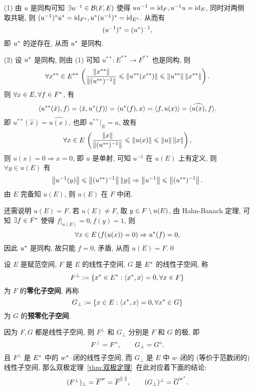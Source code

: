     \begin{Proof}
        (1) 由 $ u $ 是同构可知 $ \exists u^{-1}\in\mathcal{B}(F, E) $ 使得 $ uu^{-1}=\mathrm{id}_{F}, u^{-1}u=\mathrm{id}_{E} $, 同时对两侧取共轭, 则 $ (u^{-1})^{*}u^{*}=\mathrm{id}_{F^{*}},u^{*}(u^{-1})^{*}=\mathrm{id}_{E^{*}}  $. 从而有
        \[
            (u^{-1})^{*}=(u^{*})^{-1},
        \]
        即 $ u^{*} $ 的逆存在, 从而 $ u^{*} $ 是同构.

        (2) 设 $ u^{*} $ 是同构, 则由 (1) 可知 $ u^{**}: E^{**}\to F^{**} $ 也是同构, 则
        \[
            \forall x^{**}\in E^{**}\,\left(\frac{\left\| x^{**} \right\|}{\left\| (u^{**})^{-1} \right\|}\leqslant\left\| u^{**}(x^{**}) \right\|\leqslant\left\| u^{**} \right\|\left\| x^{**} \right\|\right).
        \]
        则 $ \forall x\in E, \forall f\in F^{*} $, 有
        \[
            \left\langle u^{**}(\hat{x}), f \right\rangle=\left\langle \hat{x}, u^{*}(f) \right\rangle=\left\langle u^{*}(f), x \right\rangle=\left\langle f, u(x) \right\rangle=\langle\widehat{u(x)}, f\rangle.
        \]
        即 $ u^{**}(\hat{x})=\widehat{u(x)} $, 也即 $ u^{**}|_{E}=u $, 故有
        \[
            \forall x\in E\,\left( \frac{\left\| x \right\|}{\left\| (u^{**})^{-1} \right\|}\leqslant\left\| u(x) \right\|\leqslant\left\| u \right\|\left\| x \right\| \right),
        \]
        则 $ u(x)=0\Longrightarrow x=0 $, 即 $ u $ 是单射, 可知 $ u^{-1} $ 在 $ u(E) $ 上有定义, 则 $ \forall y\in u(E) $ 有
        \[
            \left\| u^{-1}(y) \right\|\leqslant\left\| (u^{**})^{-1} \right\|\left\| y \right\|\Rightarrow \left\| u^{-1} \right\|\leqslant\left\| (u^{**})^{-1} \right\|.
        \]
        由 $ E $ 完备知 $ u(E) $, 则 $ u(E) $ 在 $ F $ 中闭.

        还需说明 $ u(E)=F $. 若 $ u(E)\ne F $, 取 $ y\in F\setminus u(E) $, 由 Hahn-Banach 定理, 可知 $ \exists f\in F^{*} $ 使得 $ f|_{u(E)}=0, f(y)=1 $, 则
        \[
            \forall x\in E\,(f(u(x))=0)\Rightarrow u^{*}(f)=0,
        \]
        因此 $ u^{*} $ 是同构, 故只能 $ f=0 $, 矛盾, 从而 $ u(E)=F $.\qed
    \end{Proof}

    \begin{Definition}\label{def:零化子空间}
        设 $ E $ 是赋范空间, $ F $ 是 $ E $ 的线性子空间, $ G $ 是 $ E^{*} $ 的线性子空间, 称
        \[
            F^{\bot}:=\{ x^{*}\in E^{*}:\left\langle x^{*}, x \right\rangle=0, \forall x\in F \}
        \]
        为 $ F $ 的\textbf{零化子空间}, 再称
        \[
            G_{\bot}:=\{ x\in E:\left\langle x^{*}, x \right\rangle=0, \forall x^{*}\in G \}
        \]
        为 $ G $ 的\textbf{预零化子空间}.
    \end{Definition}

    \begin{Remark}
        因为 $ F, G $ 都是线性子空间, 则 $ F^{\bot} $ 和 $ G_{\bot} $ 分别是 $ F $ 和 $ G $ 的极, 即
        \[
            F^{\bot}=F^{\circ},\qquad G_{\bot}=G^{\circ}.
        \]
        且 $ F^{\bot} $ 是 $ E^{*} $ 中的 $ w^{*} $--闭的线性子空间, 而 $ G_{\bot} $ 是 $ E $ 中 $ w $--闭的 (等价于范数闭的) 线性子空间, 那么双极定理~\ref{thm:双极定理}~在此对应着下面的结论:
        \[
            (F^{\bot})_{\bot}=\overline{F}^{w}=\overline{F}^{\left\| \cdot \right\|}, \qquad (G_{\bot})^{\bot}=\overline{G}^{w^{*}}.
        \]
    \end{Remark}

